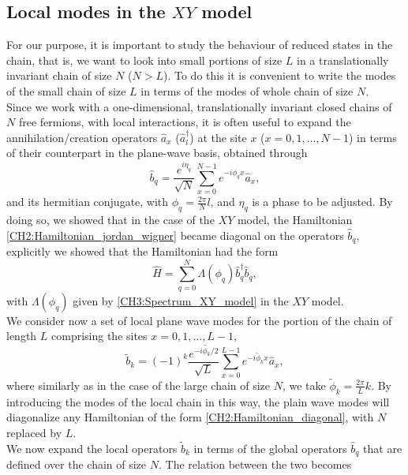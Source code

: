 \subsection{Local modes in the $XY$ model}
For our purpose, it is important to study the behaviour of reduced states in the chain, that is, we want to look into small portions of size $L$ in a translationally invariant chain of size $N$ ($N>L$). To do this it is convenient to write the modes of the small chain of size $L$ in terms of the modes of whole chain of size $N$.\\
 Since we work with a one-dimensional, translationally invariant closed chains of $N$ free fermions, with local interactions, it is often useful to expand the annihilation/creation operators $\hat{a}_x$ ($\hat{a}^{\dagger}_l$) at the site $x$ ($x = 0,1,\ldots, N-1$) in terms of their counterpart in the plane-wave basis, obtained through
\begin{equation}
\hat{b}_{q} = \frac{e^{i\eta_q}}{\sqrt{N}}\sum_{x=0}^{N-1}e^{-i\phi_q x}\hat{a}_x,
\end{equation}
and its hermitian conjugate, with $\phi_q = \frac{2\pi}{N}l$, and $\eta_q$ is a phase to be adjusted. By doing so, we showed that in the case of the $XY$ model, the Hamiltonian \eqref{CH2:Hamiltonian_jordan_wigner} became diagonal on the operators $\hat{b}_q$, explicitly we showed that the Hamiltonian had the form
\begin{equation}
\hat{H} = \sum_{q=0}^{N} \Lambda(\phi_q)\hat{b}_q^{\dagger}\hat{b}_q,
\label{CH2:Hamiltonian_diagonal}
\end{equation}
with $\Lambda(\phi_q)$ given by \eqref{CH3:Spectrum_XY_model} in the $XY$ model.\\
\indent We consider now a set of local plane wave modes for the portion of the chain of length $L$ comprising the sites $x=0,1,\ldots,L-1$,
\begin{equation}
\tilde{b}_k = (-1)^{k}\frac{e^{-i\tilde{\phi_k}/2}}{\sqrt{L}}\sum_{x=0}^{L-1}e^{-i\tilde{\phi}_k x}\hat{a}_x,
\end{equation}
where similarly as in the case of the large chain of size $N$, we take $\tilde{\phi}_k = \frac{2\pi}{L}k$. By introducing the modes of the local chain in this way, the plain wave modes will diagonalize any Hamiltonian of the form \eqref{CH2:Hamiltonian_diagonal}, with $N$ replaced by $L$.\\
\indent We now expand the local operators $\tilde{b}_k$ in terms of the global operators $\hat{b}_q$ that are defined over the chain of size $N$. The relation between the two becomes

